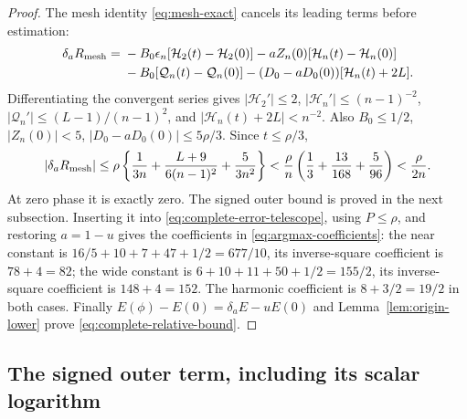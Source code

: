 \begin{proof}
The mesh identity \eqref{eq:mesh-exact} cancels its leading terms
before estimation:
\begin{align*}
 \delta_aR_{\rm mesh}={}&-B_0\epsilon_n[\mathcal H_2(t)-\mathcal H_2(0)]
 -aZ_n(0)[\mathcal H_n(t)-\mathcal H_n(0)]\\
 &-B_0[\mathcal Q_n(t)-\mathcal Q_n(0)]
 -(D_0-aD_0(0))[\mathcal H_n(t)+2L].
\end{align*}
Differentiating the convergent series gives
$|\mathcal H_2'|\leq2$,
$|\mathcal H_n'|\leq(n-1)^{-2}$,
$|\mathcal Q_n'|\leq(L-1)/(n-1)^2$, and
$|\mathcal H_n(t)+2L|<n^{-2}$.
Also $B_0\leq1/2$, $|Z_n(0)|<5$,
$|D_0-aD_0(0)|\leq5\rho/3$. Since $t\leq\rho/3$,
\[
 |\delta_aR_{\rm mesh}|\leq\rho\left\{\frac1{3n}
            +\frac{L+9}{6(n-1)^2}+\frac5{3n^2}\right\}
 <\frac\rho n\left(\frac13+\frac{13}{168}+\frac5{96}\right)
 <\frac\rho{2n}.
\]
At zero phase it is exactly zero. The signed outer bound is proved in
the next subsection. Inserting it into
\eqref{eq:complete-error-telescope}, using $P\leq\rho$, and restoring
$a=1-u$ gives the coefficients in \eqref{eq:argmax-coefficients}:
the near constant is $16/5+10+7+47+1/2=677/10$, its inverse-square
coefficient is $78+4=82$; the wide constant is
$6+10+11+50+1/2=155/2$, its inverse-square coefficient is $148+4=152$.
The harmonic coefficient is $8+3/2=19/2$ in both cases.
Finally $E(\phi)-E(0)=\delta_aE-uE(0)$ and
Lemma~\ref{lem:origin-lower} prove \eqref{eq:complete-relative-bound}.
\end{proof}

\subsection{The signed outer term, including its scalar logarithm}

